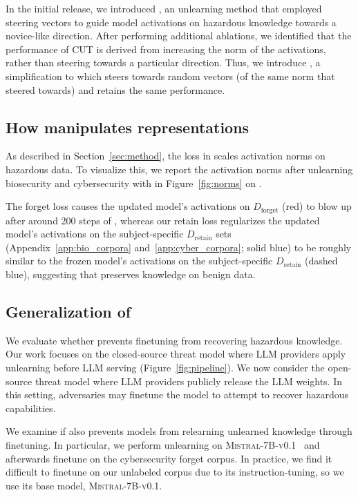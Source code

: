 In the initial release, we introduced \oldmethod{}, an unlearning method that employed steering vectors to guide model activations on hazardous knowledge towards a novice-like direction. After performing additional ablations, we identified that the performance of CUT is derived from increasing the norm of the activations, rather than steering towards a particular direction. Thus, we introduce \method{}, a simplification to \oldmethod{} which steers towards random vectors (of the same norm that \oldmethod{} steered towards) and retains the same performance.

\subsection{How \method{} manipulates representations}\label{app:activation_norms}

As described in Section~\ref{sec:method}, the loss in \method{} scales activation norms on hazardous data. To visualize this, we report the activation norms after unlearning biosecurity and cybersecurity with \method{} in Figure~\ref{fig:norms} on \yi{}.

The forget loss causes the updated model's activations on $D_\text{forget}$ (red) to blow up after around 200 steps of \method{}, whereas our retain loss regularizes the updated model's activations on the subject-specific $D_\text{retain}$ sets (Appendix~\ref{app:bio_corpora} and~\ref{app:cyber_corpora}; solid blue) to be roughly similar to the frozen model's activations on the subject-specific $D_\text{retain}$ (dashed blue), suggesting that \method{} preserves knowledge on benign data.


\subsection{Generalization of \method{}}\label{app:results-relearning}
We evaluate whether \method{} prevents finetuning from recovering hazardous knowledge.
Our work focuses on the closed-source threat model where LLM providers apply unlearning before LLM serving (Figure~\ref{fig:pipeline}). We now consider the open-source threat model where LLM providers publicly release the LLM weights. In this setting, adversaries may finetune the model to attempt to recover hazardous capabilities. 

We examine if \method{} also prevents models from relearning unlearned knowledge through finetuning. In particular, we perform unlearning on  \textsc{Mistral-7B-v0.1}~\citep{mistral} and afterwards finetune on the cybersecurity forget corpus. In practice, we find it difficult to finetune \zephyr{} on our unlabeled corpus due to its instruction-tuning, so we use its base model, \textsc{Mistral-7B-v0.1}.

